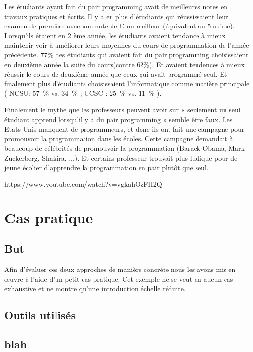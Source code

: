 \documentclass[journal, a4paper, frenchb]{IEEEtran}
\begin{document}
Les étudiants ayant fait du pair programming avait de meilleures notes en travaux pratiques et écrits.
Il y a eu plus d’étudiants qui réussissaient leur examen de première avec une note de C ou meilleur
(équivalent au 5 suisse). Lorsqu’ils étaient en 2 ème année, les étudiants avaient tendance à mieux
maintenir voir à améliorer leurs moyennes du cours de programmation de l’année précédente. 77\%
des étudiants qui avaient fait du pair programming choisissaient en deuxième année la suite du cours(contre 62\%). Et avaient tendences à mieux réussir le cours de deuxième année que ceux qui avait
programmé seul. Et finalement plus d’étudiants choisissaient l’informatique comme matière
principale ( NCSU: 57~\% vs. 34~\% ; UCSC : 25~\% vs. 11~\% ).

Finalement le mythe que les professeurs peuvent avoir sur « seulement un seul étudiant apprend
lorsqu’il y a du pair programming » semble être faux. Les Etats-Unis manquent de programmeurs, et
donc ils ont fait une campagne pour promouvoir la programmation dans les écoles. Cette campagne
demandait à beaucoup de célébrités de promouvoir la programmation (Barack Obama, Mark
Zuckerberg, Shakira, ...). Et certains professeur trouvait plus ludique pour de jeune écolier
d’apprendre la programmation en pair plutôt que seul.

https://www.youtube.com/watch?v=vgkahOzFH2Q

\section{Cas pratique}

\subsection{But}

Afin d'évaluer ces deux approches de manière concrète nous les avons mis en œuvre à l'aide d'un petit cas pratique. Cet exemple ne se veut en aucun cas exhaustive et ne montre qu'une introduction échelle réduite.


\subsection{Outils utilisés}

\subsection{blah}
\end{document}

